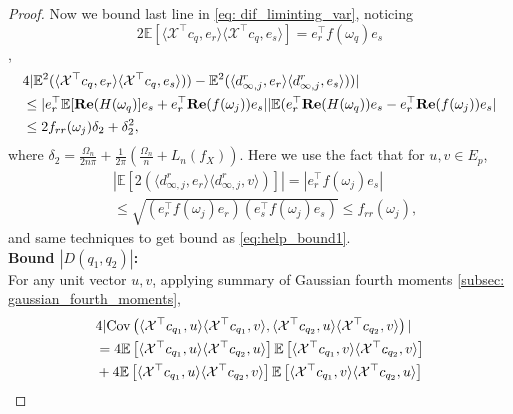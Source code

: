 \begin{proof}
Now we bound last line in \eqref{eq: dif_liminting_var}, noticing 
\[
2\mathbb{E}[\langle \mathcal{X}^\top  c_{q}, e_r\rangle\langle \mathcal{X}^\top  c_{q}, e_s\rangle] = e_r^\top  f(\omega_q)e_s
\], 
\begin{equation}
\begin{aligned}
&4|\mathbb{E}^2(\langle \mathcal{X}^\top  c_q,e_r\rangle \langle \mathcal{X}^\top  c_q,e_s\rangle) )-\mathbb{E}^2(\langle d^{r}_{\infty, j},e_r\rangle \langle d^{r}_{\infty, j},e_s\rangle) )|\\
&\le | e_r^\top  \mathbb{E}[{\bf Re}(H(\omega_q)]e_s+e_r^\top  {\bf Re}(f(\omega_j))e_s||\mathbb{E} (e_r^\top  {\bf Re}(H(\omega_q))e_s-e_r^\top  {\bf Re}(f(\omega_j))e_s|\\
&\le 2f_{rr}(\omega_j)\delta_2+\delta_2^2,
\end{aligned}
\end{equation}
where $\delta_2= \frac{\Omega_n}{2n\pi}+ \frac{1}{2\pi}\left(\frac{\Omega_n}{n} + L_n(f_X)\right)$. Here we use the fact that for $u, v\in E_p$, 
\begin{equation}
\begin{aligned}
&|\mathbb{E} [2(\langle d^{r}_{\infty, j},e_r\rangle \langle d^{r}_{\infty, j},v\rangle)]|  = |e_r^\top  f(\omega_j)e_s|\\
&\le \sqrt{(e_r^\top  f(\omega_j)e_r)(e_s^\top  f(\omega_j)e_s)}\le f_{rr}(\omega_j), 
\end{aligned}
\end{equation}
and same techniques to get bound as \eqref{eq:help_bound1}. \\[0.2cm]
{\bf Bound $|D(q_1,q_2)|$:}\\
For any unit vector $u,v$, applying summary of Gaussian fourth moments \ref{subsec: gaussian_fourth_moments}, 
\begin{equation}
\begin{aligned}
&4|\cov\left(\langle \mathcal{X}^\top  c_{q_1}, u \rangle  \langle \mathcal{X}^\top  c_{q_1}, v \rangle ,  \langle \mathcal{X}^\top  c_{q_2}, u \rangle  \langle \mathcal{X}^\top  c_{q_2}, v \rangle\right)| \\
&= 4\mathbb{E} \left[ \langle \mathcal{X}^\top  c_{q_1}, u \rangle  \langle \mathcal{X}^\top  c_{q_2}, u \rangle \right] \mathbb{E} \left[ \langle \mathcal{X}^\top  c_{q_1}, v \rangle  \langle \mathcal{X}^\top  c_{q_2}, v \rangle \right]\\
&+4\mathbb{E} \left[ \langle \mathcal{X}^\top  c_{q_1}, u \rangle  \langle \mathcal{X}^\top  c_{q_2}, v \rangle \right]\mathbb{E} \left[ \langle \mathcal{X}^\top  c_{q_1}, v \rangle  \langle \mathcal{X}^\top  c_{q_2}, u \rangle \right]

\end{aligned}
\end{equation}
\end{proof}
